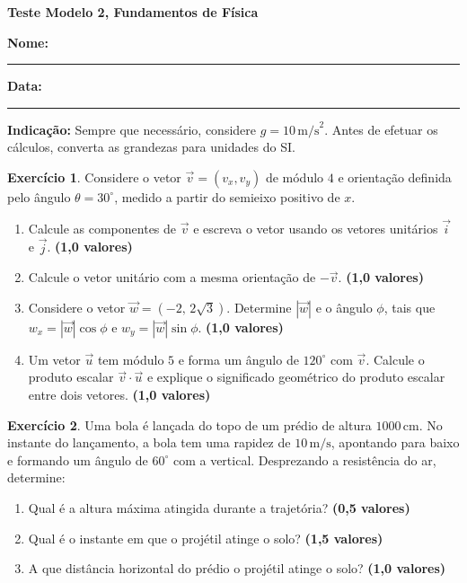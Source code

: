\documentclass[12pt]{article}
\newcommand{\cabecalho}{
    \hfill
    \begin{minipage}[t]{0.7\textwidth}
        \raggedleft
        \textbf{Teste Modelo 2, Fundamentos de Física}
    \end{minipage}
    \vspace{0.35cm}
}
\newcommand{\pontos}[1]{\hfill\textbf{(#1 valores)}}
\begin{document}
\cabecalho

\textbf{Nome:} \rule{10cm}{0.4pt}
\hfill
\textbf{Data:} \rule{2.5cm}{0.4pt}

\vspace{0.2cm}

\textbf{Indicação:} Sempre que necessário, considere $g = 10\,\text{m/s}^2$.
Antes de efetuar os cálculos, converta as grandezas para unidades do SI.

\vspace{0.25cm}

\textbf{Exercício 1}. Considere o vetor $\vec{v}=(v_x,v_y)$ de módulo $4$ e
orientação definida pelo ângulo $\theta=30^\circ$, medido a partir do semieixo positivo
de $x$.

\begin{enumerate}[label=\textbf{\alph*)}]
    \item Calcule as componentes de $\vec{v}$ e escreva o vetor usando os vetores
    unitários $\vec{i}$ e $\vec{j}$. \pontos{1,0}
    \item Calcule o vetor unitário com a mesma orientação de $-\vec{v}$. \pontos{1,0}
    \item Considere o vetor $\vec{w}=(-2,\,2\sqrt{3})$. Determine $|\vec{w}|$ e o
    ângulo $\phi$, tais que $w_x=|\vec{w}|\cos\phi$ e
    $w_y=|\vec{w}|\sin\phi$. \pontos{1,0}
    \item Um vetor $\vec{u}$ tem módulo $5$ e forma um ângulo de $120^\circ$ com
    $\vec{v}$. Calcule o produto escalar $\vec{v}\cdot\vec{u}$ e explique o significado
    geométrico do produto escalar entre dois vetores. \pontos{1,0}
\end{enumerate}

\vspace{0.25cm}

\textbf{Exercício 2}. Uma bola é lançada do topo de um prédio de altura
$1000\,\text{cm}$. No instante do lançamento, a bola tem uma rapidez de
$10\,\text{m/s}$, apontando para baixo e formando um ângulo de $60^\circ$ com a
vertical. Desprezando a resistência do ar, determine:

\begin{enumerate}[label=\textbf{\alph*)}]
    \item Qual é a altura máxima atingida durante a trajetória? \pontos{0,5}
    \item Qual é o instante em que o projétil atinge o solo? \pontos{1,5}
    \item A que distância horizontal do prédio o projétil atinge o solo? \pontos{1,0}
\end{enumerate}
\end{document}
